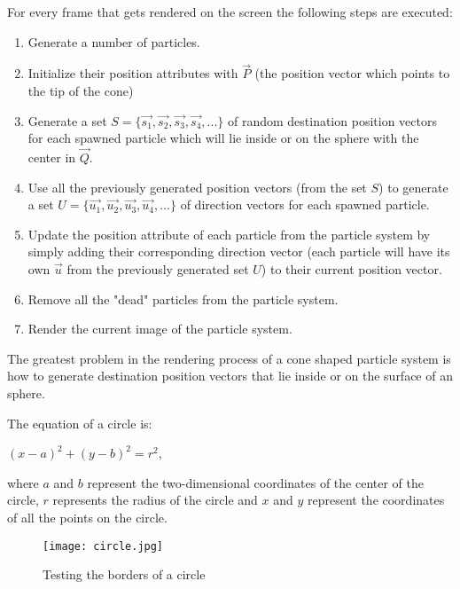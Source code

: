 For every frame that gets rendered on the screen the following steps are executed:

\begin{enumerate}
	\item Generate a number of particles.
	
	\item Initialize their position attributes with $\vec{P}$ (the position vector which points to the tip of the cone)
	
	\item Generate a set $S = \{\vec{s_1}, \vec{s_2}, \vec{s_3}, \vec{s_4}, ...\}$ of random destination position vectors for each spawned particle which will lie inside or on the sphere with the center in $\vec{Q}$.
	
	\item Use all the previously generated position vectors (from the set $S$) to generate a set $U = \{\vec{u_1}, \vec{u_2}, \vec{u_3}, \vec{u_4}, ...\}$ of direction vectors for each spawned particle.
	
	\item Update the position attribute of each particle from the particle system by simply adding their corresponding direction vector (each particle will have its own $\vec{u}$ from the previously generated set $U$) to their current position vector.
	
	\item Remove all the "dead" particles from the particle system.
	
	\item Render the current image of the particle system.
\end{enumerate}
\newpage
The greatest problem in the rendering process of a cone shaped particle system is how to generate destination position vectors that lie inside or on the surface of an sphere.

The equation of a circle is:
\begin{center}
	$(x - a) ^ 2 + (y - b) ^ 2 = r ^ 2$,
\end{center}

where $a$ and $b$ represent the two-dimensional coordinates of the center of the circle, $r$ represents the radius of the circle and $x$ and $y$ represent the coordinates of all the points on the circle.\\

\begin{figure}[h]
	\caption{Testing the borders of a circle}
	\centering
	\texttt{[image: circle.jpg]}
\end{figure}

